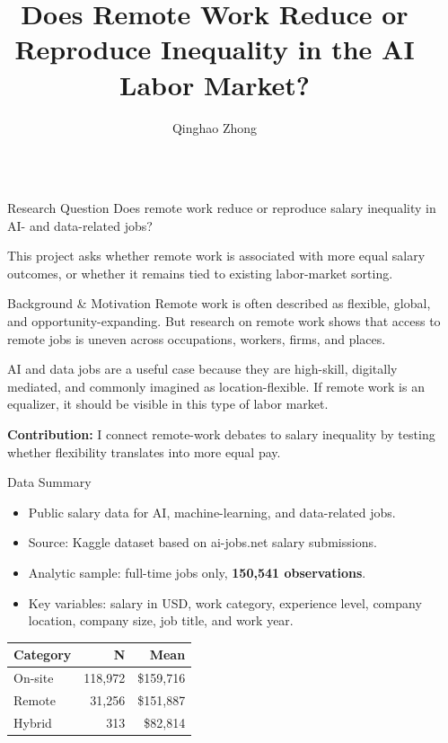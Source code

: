 \documentclass[final]{beamer}
\title{Does Remote Work Reduce or Reproduce Inequality in the AI Labor Market?}
\author{Qinghao Zhong}
\institute{MACS 30200 Computational Research Design \quad University of Chicago}
\newlength{\sepwidth}
\newlength{\colwidth}
\newcommand{\separatorcolumn}{\begin{column}{\sepwidth}\end{column}}
\begin{document}
\begin{frame}[t]
\begin{columns}[t]
\separatorcolumn

\begin{column}{\colwidth}

  \begin{alertblock}{Research Question}
    Does remote work reduce or reproduce salary inequality in AI- and data-related jobs?

    \smallskip
    This project asks whether remote work is associated with more equal salary outcomes, or whether it remains tied to existing labor-market sorting.
  \end{alertblock}

  \begin{block}{Background \& Motivation}
    Remote work is often described as flexible, global, and opportunity-expanding. But research on remote work shows that access to remote jobs is uneven across occupations, workers, firms, and places.

    \smallskip
    AI and data jobs are a useful case because they are high-skill, digitally mediated, and commonly imagined as location-flexible. If remote work is an equalizer, it should be visible in this type of labor market.

    \smallskip
    \textbf{Contribution:} I connect remote-work debates to salary inequality by testing whether flexibility translates into more equal pay.
  \end{block}

  \begin{block}{Data Summary}
    \begin{itemize}
      \item Public salary data for AI, machine-learning, and data-related jobs.
      \item Source: Kaggle dataset based on ai-jobs.net salary submissions.
      \item Analytic sample: full-time jobs only, \textbf{150,541 observations}.
      \item Key variables: salary in USD, work category, experience level, company location, company size, job title, and work year.
    \end{itemize}

    \begin{center}
    \renewcommand{\arraystretch}{1.12}
    \normalsize
    \begin{tabular}{lrr}
      \toprule
      \textbf{Category} & \textbf{N} & \textbf{Mean} \\
      \midrule
      On-site & 118,972 & \$159,716 \\
      Remote & 31,256 & \$151,887 \\
      Hybrid & 313 & \$82,814 \\
      \bottomrule
    \end{tabular}
    \end{center}
  \end{block}


\end{column}
\end{columns}
\end{frame}
\end{document}
